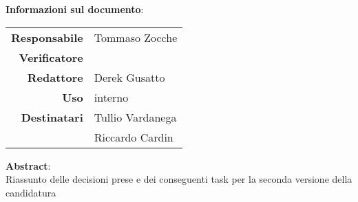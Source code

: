 \begin{center}
\textbf{Informazioni sul documento}: \\
\vspace{0.5cm}

\begin{tabular}{r|l}
    \textbf{Responsabile} &  Tommaso Zocche\\ 
    \textbf{Verificatore} &  \\ 
    \textbf{Redattore} &  Derek Gusatto  \\ 
    \textbf{Uso} & interno \\ 
    \textbf{Destinatari} & Tullio Vardanega \\ & Riccardo Cardin \\ 
\end{tabular}

\vfill

\textbf{Abstract}: \\
\vspace{0.5cm}
Riassunto delle decisioni prese e dei conseguenti task per la seconda versione della candidatura
\end{center}


\bigskip